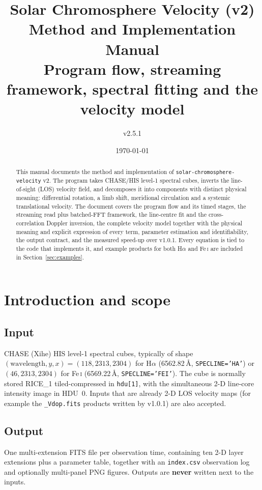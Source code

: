 \documentclass[11pt,a4paper]{article}
\title{\bfseries Solar Chromosphere Velocity (v2)\\[2mm]
       \large Method and Implementation Manual\\[1mm]
       \normalsize Program flow, streaming framework, spectral fitting and
       the velocity model}
\author{\code{solar-chromosphere-velocity} v2.5.1}
\date{\today}
\newcommand{\code}[1]{\texttt{\small #1}}
\begin{document}
\maketitle

\begin{abstract}
\noindent
This manual documents the method and implementation of
\code{solar-chromosphere-velocity} v2.  The program takes CHASE/HIS level-1
spectral cubes, inverts the line-of-sight (LOS) velocity field, and decomposes
it into components with distinct physical meaning: differential rotation, a
limb shift, meridional circulation and a systemic translational velocity.  The
document covers the program flow and its timed stages, the streaming read plus
batched-FFT framework, the line-centre fit and the cross-correlation Doppler
inversion, the complete velocity model together with the physical meaning and
explicit expression of every term, parameter estimation and identifiability,
the output contract, and the measured speed-up over v1.0.1.  Every equation is
tied to the code that implements it, and example products for both H$\alpha$
and Fe\,\textsc{i} are included in Section~\ref{sec:examples}.
\end{abstract}

\tableofcontents
\vspace{4mm}

\section{Introduction and scope}

\subsection{Input}
CHASE (Xihe) HIS level-1 spectral cubes, typically of shape
$(\text{wavelength}, y, x) = (118, 2313, 2304)$ for H$\alpha$
(6562.82\,\AA, \code{SPECLINE='HA'}) or $(46, 2313, 2304)$ for Fe\,\textsc{i}
(6569.22\,\AA, \code{SPECLINE='FEI'}).  The cube is normally stored RICE\_1
tiled-compressed in \code{hdu[1]}, with the simultaneous 2-D line-core
intensity image in HDU~0.  Inputs that are already 2-D LOS velocity maps
(for example the \code{*\_Vdop.fits} products written by v1.0.1) are also
accepted.

\subsection{Output}
One multi-extension FITS file per observation time, containing ten 2-D layer
extensions plus a parameter table, together with an \code{index.csv}
observation log and optionally multi-panel PNG figures.  Outputs are
\textbf{never} written next to the inputs.
\end{document}
